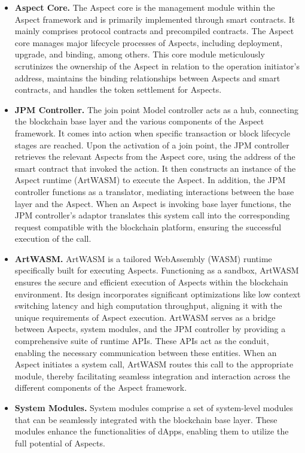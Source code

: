 \begin{itemize}
  \item \textbf{Aspect Core.} The Aspect core is the management module within the Aspect framework and is primarily implemented through smart contracts. It mainly comprises protocol contracts and precompiled contracts. The Aspect core manages major lifecycle processes of Aspects, including deployment, upgrade, and binding, among others. This core module meticulously scrutinizes the ownership of the Aspect in relation to the operation initiator's address, maintains the binding relationships between Aspects and smart contracts, and handles the token settlement for Aspects.
  
  \item \textbf{JPM Controller.} The join point Model controller acts as a hub, connecting the blockchain base layer and the various components of the Aspect framework. It comes into action when specific transaction or block lifecycle stages are reached. Upon the activation of a join point, the JPM controller retrieves the relevant Aspects from the Aspect core, using the address of the smart contract that invoked the action. It then constructs an instance of the Aspect runtime (ArtWASM) to execute the Aspect. In addition, the JPM controller functions as a translator, mediating interactions between the base layer and the Aspect. When an Aspect is invoking base layer functions, the JPM controller's adaptor translates this system call into the corresponding request compatible with the blockchain platform, ensuring the successful execution of the call.
  
  \item \textbf{ArtWASM.} ArtWASM is a tailored WebAssembly (WASM) runtime specifically built for executing Aspects. Functioning as a sandbox, ArtWASM ensures the secure and efficient execution of Aspects within the blockchain environment. Its design incorporates significant optimizations like low context switching latency and high computation throughput, aligning it with the unique requirements of Aspect execution. ArtWASM serves as a bridge between Aspects, system modules, and the JPM controller by providing a comprehensive suite of runtime APIs. These APIs act as the conduit, enabling the necessary communication between these entities. When an Aspect initiates a system call, ArtWASM routes this call to the appropriate module, thereby facilitating seamless integration and interaction across the different components of the Aspect framework.
  
  \item \textbf{System Modules.} System modules comprise a set of system-level modules that can be seamlessly integrated with the blockchain base layer. These modules enhance the functionalities of dApps, enabling them to utilize the full potential of Aspects.
  

\end{itemize}
